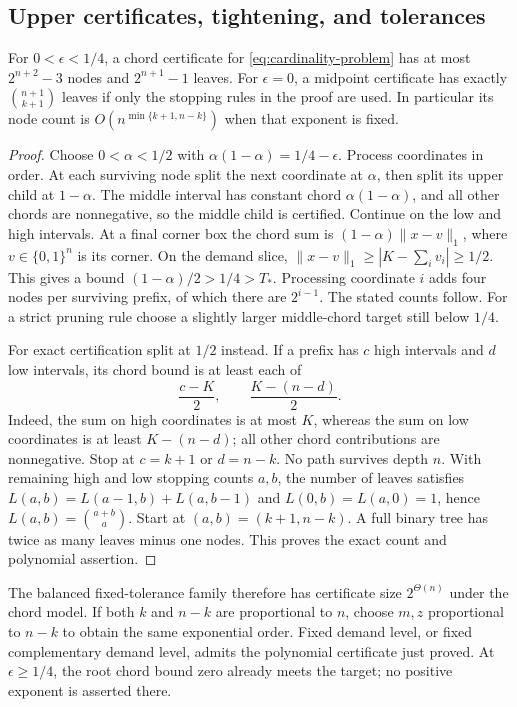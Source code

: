 \subsection{Upper certificates, tightening, and tolerances}
\begin{proposition}\label{prop:chord-upper}
For $0<\epsilon<1/4$, a chord certificate for
\eqref{eq:cardinality-problem} has at most $2^{n+2}-3$ nodes and
$2^{n+1}-1$ leaves. For $\epsilon=0$, a midpoint certificate has exactly
$\binom{n+1}{k+1}$ leaves if only the stopping rules in the proof are used.
In particular its node count is
$O(n^{\min\{k+1,n-k\}})$ when that exponent is fixed.
\end{proposition}
\begin{proof}
Choose $0<\alpha<1/2$ with
$\alpha(1-\alpha)=1/4-\epsilon$. Process coordinates in order. At each
surviving node split the next coordinate at $\alpha$, then split its
upper child at $1-\alpha$. The middle interval has constant chord
$\alpha(1-\alpha)$, and all other chords are nonnegative, so the middle
child is certified. Continue on the low and high intervals. At a final
corner box the chord sum is $(1-\alpha)\|x-v\|_1$, where
$v\in\{0,1\}^n$ is its corner. On the demand slice,
$\|x-v\|_1\ge|K-\sum_i v_i|\ge1/2$. This gives a bound
$(1-\alpha)/2>1/4>T_*$. Processing coordinate $i$ adds four nodes per
surviving prefix, of which there are $2^{i-1}$. The stated counts follow.
For a strict pruning rule choose a slightly larger middle-chord target
still below $1/4$.

For exact certification split at $1/2$ instead. If a prefix has $c$ high
intervals and $d$ low intervals, its chord bound is at least each of
\[
 \frac{c-K}{2},\qquad \frac{K-(n-d)}2.
\]
Indeed, the sum on high coordinates is at most $K$, whereas the sum on
low coordinates is at least $K-(n-d)$; all other chord contributions
are nonnegative. Stop at $c=k+1$ or $d=n-k$. No path survives depth $n$.
With remaining high and low stopping counts $a,b$, the number of leaves
satisfies $L(a,b)=L(a-1,b)+L(a,b-1)$ and
$L(0,b)=L(a,0)=1$, hence $L(a,b)=\binom{a+b}{a}$. Start at
$(a,b)=(k+1,n-k)$. A full binary tree has twice as many leaves minus one
nodes. This proves the exact count and polynomial assertion.
\end{proof}

The balanced fixed-tolerance family therefore has certificate size
$2^{\Theta(n)}$ under the chord model. If both $k$ and $n-k$ are
proportional to $n$, choose $m,z$ proportional to $n-k$ to obtain the
same exponential order. Fixed demand level, or fixed complementary demand
level, admits the polynomial certificate just proved. At
$\epsilon\ge1/4$, the root chord bound zero already meets the target;
no positive exponent is asserted there.

